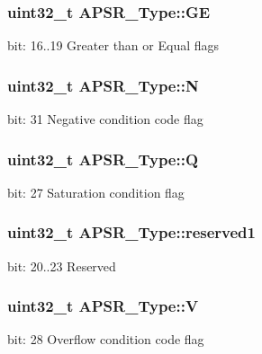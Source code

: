 \subsubsection[{\texorpdfstring{GE}{GE}}]{\setlength{\rightskip}{0pt plus 5cm}uint32\+\_\+t A\+P\+S\+R\+\_\+\+Type\+::\+GE}\hypertarget{union_a_p_s_r___type_adcb98a5b9c93b0cb69cdb7af5638f32e}{}\label{union_a_p_s_r___type_adcb98a5b9c93b0cb69cdb7af5638f32e}
bit\+: 16..19 Greater than or Equal flags 
\subsubsection[{\texorpdfstring{N}{N}}]{\setlength{\rightskip}{0pt plus 5cm}uint32\+\_\+t A\+P\+S\+R\+\_\+\+Type\+::N}\hypertarget{union_a_p_s_r___type_a7e7bbba9b00b0bb3283dc07f1abe37e0}{}\label{union_a_p_s_r___type_a7e7bbba9b00b0bb3283dc07f1abe37e0}
bit\+: 31 Negative condition code flag 
\subsubsection[{\texorpdfstring{Q}{Q}}]{\setlength{\rightskip}{0pt plus 5cm}uint32\+\_\+t A\+P\+S\+R\+\_\+\+Type\+::Q}\hypertarget{union_a_p_s_r___type_a22d10913489d24ab08bd83457daa88de}{}\label{union_a_p_s_r___type_a22d10913489d24ab08bd83457daa88de}
bit\+: 27 Saturation condition flag 
\subsubsection[{\texorpdfstring{reserved1}{reserved1}}]{\setlength{\rightskip}{0pt plus 5cm}uint32\+\_\+t A\+P\+S\+R\+\_\+\+Type\+::reserved1}\hypertarget{union_a_p_s_r___type_a268939f602ca41cb4f1f71d7f0eae806}{}\label{union_a_p_s_r___type_a268939f602ca41cb4f1f71d7f0eae806}
bit\+: 20..23 Reserved 
\subsubsection[{\texorpdfstring{V}{V}}]{\setlength{\rightskip}{0pt plus 5cm}uint32\+\_\+t A\+P\+S\+R\+\_\+\+Type\+::V}\hypertarget{union_a_p_s_r___type_a8004d224aacb78ca37774c35f9156e7e}{}\label{union_a_p_s_r___type_a8004d224aacb78ca37774c35f9156e7e}
bit\+: 28 Overflow condition code flag 
